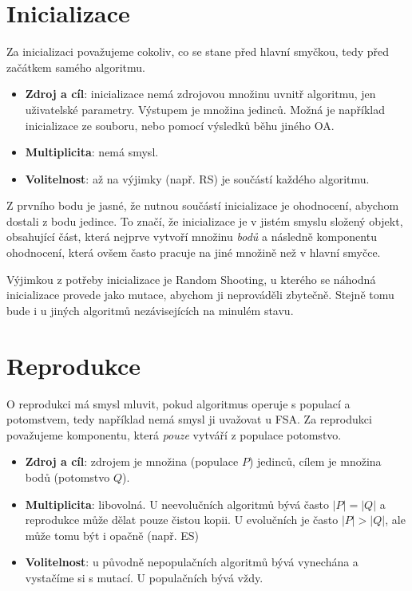 \section{Inicializace}

Za inicializaci považujeme cokoliv, co se stane před hlavní smyčkou, tedy před začátkem samého algoritmu.
\begin{itemize}
  \item \textbf{Zdroj a cíl}: inicializace nemá zdrojovou množinu uvnitř algoritmu, jen uživatelské parametry. Výstupem je množina jedinců. Možná je například inicializace ze souboru, nebo pomocí výsledků běhu jiného OA.
  \item \textbf{Multiplicita}: nemá smysl.
  \item \textbf{Volitelnost}: až na výjimky (např. RS) je součástí každého algoritmu.
\end{itemize}

Z prvního bodu je jasné, že nutnou součástí inicializace je ohodnocení, abychom dostali z bodu jedince. To značí, že inicializace je v jistém smyslu složený objekt, obsahující část, která nejprve vytvoří množinu \emph{bodů} a následně komponentu ohodnocení, která ovšem často pracuje na jiné množině než v hlavní smyčce.

Výjimkou z potřeby inicializace je Random Shooting, u kterého se náhodná inicializace provede jako mutace, abychom ji neprováděli zbytečně. Stejně tomu bude i u jiných algoritmů nezávisejících na minulém stavu.

\section{Reprodukce}

O reprodukci má smysl mluvit, pokud algoritmus operuje s populací a potomstvem, tedy například nemá smysl ji uvažovat u FSA. Za reprodukci považujeme komponentu, která \emph{pouze} vytváří z populace potomstvo.
\begin{itemize}
  \item \textbf{Zdroj a cíl}: zdrojem je množina (populace $P$) jedinců, cílem je množina bodů (potomstvo $Q$).
  \item \textbf{Multiplicita}: libovolná. U neevolučních algoritmů bývá často $|P|=|Q|$ a reprodukce může dělat pouze čistou kopii. U evolučních je často $|P|>|Q|$, ale může tomu být i opačně (např. ES)
  \item \textbf{Volitelnost}: u původně nepopulačních algoritmů bývá vynechána a vystačíme si s mutací. U populačních bývá vždy.
\end{itemize}

